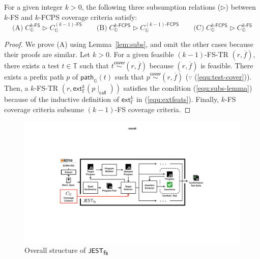 \documentclass[acmsmall,review,screen]{acmart}
\newcommand{\name}[1]{\textsf{#1}}
\newcommand{\sname}[1]{\name{\small #1}}
\newcommand{\jest}{\sname{JEST}}
\newcommand{\tool}{\jest_{\sname{fs}}}
\newcommand{\graph}{\mathbb{G}}
\newcommand{\pat}{p}
\newcommand{\patmap}[1]{\name{path}_{#1}}
\newcommand{\testset}{\mathbb{T}}
\newcommand{\test}{t}
\newcommand{\cover}{\overset{\name{cover}}{\sim}}
\newcommand{\tr}{r}
\newcommand{\cov}[1]{C_{#1}}
\newcommand{\featset}{\mathbb{F}}
\newcommand{\feat}{f}
\newcommand{\feats}{\overline{\feat}}
\newcommand{\extfeat}{\name{ext}_\featset}
\newcommand{\extfeats}[1]{\extfeat^{#1}}
\newcommand{\css}[1]{{#1}\!\mid_{\name{call}}}
\newcommand{\kfcov}[2]{\cov{#2}^{{#1}\name{-FS}}}
\newcommand{\subs}{\rhd}
\newcommand{\kfcpcov}[2]{\cov{#2}^{{#1}\name{-FCPS}}}
\begin{document}
\begin{theorem}\label{thm:subs}
  For a given integer $k > 0$, the following three subsumption relations
  ($\subs$) between $k$-FS and $k$-FCPS coverage criteria satisfy:
  \[
    \text{(A)} \; \kfcov{k}{\graph} \subs \kfcov{(k-1)}{\graph} \qquad
    \text{(B)} \; \kfcpcov{k}{\graph} \subs \kfcpcov{(k-1)}{\graph} \qquad
    \text{(C)} \; \kfcpcov{k}{\graph} \subs \kfcov{k}{\graph}
  \]
\end{theorem}

\begin{proof}
  We prove (A) using Lemma~\ref{lem:subs}, and omit
  the other cases because their proofs are similar.
  Let $k > 0$.
  For a given feasible $(k-1)$-FS-TR $(\tr, \feats)$, there exists a test $\test
  \in \testset$ such that $\test \cover (\tr, \feats)$ because $(\tr, \feats)$
  is feasible.
  There exists a prefix path $\pat$ of $\patmap{\graph}(\test)$ such that $\pat
  \cover (\tr, \feats)$ ($\because$ (\ref{equ:test-cover})).
  Then, a $k$-FS-TR $(\tr, \extfeats{k}(\css{\pat}))$ satisfies the condition
  (\ref{equ:subs-lemma}) because of the inductive definition of $\extfeats{k}$
  in (\ref{equ:extfeats}).
  Finally, $k$-FS coverage criteria subsume $(k-1)$-FS coverage criteria.
\end{proof}


%

\begin{figure}
  \includegraphics[width=.9\textwidth]{img/overall}
\vspace*{-.5em}
  \caption{Overall structure of $\tool$}
  \label{fig:overall}
\vspace*{-1em}
\end{figure}
\end{document}
